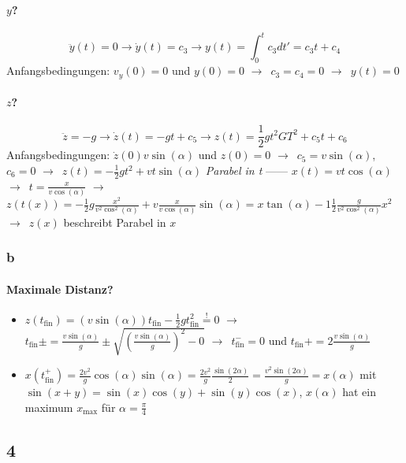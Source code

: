 \documentclass[oneside]{book}
\theoremstyle{definition}
\newcommand{\conseq}{$\rightarrow$~}
\newcommand{\tfin}{t_\text{fin}}
\begin{document}
\paragraph{$y$?}
$$\ddot{y}(t) = 0 \rightarrow \dot{y}(t) = c_3 \rightarrow y(t) = \int_0^t c_3 d t' = c_3 t + c_4$$
Anfangsbedingungen: $v_y(0) = 0$ und $y(0) = 0$ \conseq $c_3 = c_4 = 0$ \conseq $y(t) = 0$

\paragraph{$z$?}
$$\ddot{z} = -g \rightarrow \dot{z}(t) = - gt + c_5 \rightarrow z(t) = \frac{1}{2} g t^2 GT^2 + c_5 t +c_6$$
Anfangsbedingungen: $\dot{z}(0) v \sin(\alpha)$ und $z(0) = 0$ \conseq $c_5 = v \sin(\alpha)$, $c_6 = 0$ \conseq $z(t) = - \frac{1}{2} g t^2 + v t \sin(\alpha)$ \textit{Parabel in t}
------
$x(t) = v t \cos(\alpha)$ \conseq $t = \frac{x}{v \cos(\alpha)}$ \conseq $z(t(x)) = - \frac{1}{2} g \frac{x^2}{v^2 \cos^2(\alpha)} + v \frac{x}{v \cos(\alpha)} \sin(\alpha) = x\tan(\alpha) - 1 \frac{1}{2} \frac{g}{v^2 \cos^2(\alpha)} x^2$ \conseq $z(x)$ beschreibt Parabel in $x$

\subsubsection{b}

\paragraph{Maximale Distanz?}
\begin{itemize}
	\item $z(\tfin) = (v \sin(\alpha)) \tfin - \frac{1}{2} g \tfin^2 \overset{!}{=} 0$ \conseq $\tfin\pm = \frac{v \sin(\alpha)}{g} \pm \sqrt{(\frac{v \sin(\alpha)}{g})^2 - 0}$ \conseq $\tfin^- = 0$ und $\tfin+ = 2 \frac{v \sin(\alpha)}{g}$
	\item $x(\tfin^+) = \frac{2 v^2}{g} \cos(\alpha) \sin(\alpha) = \frac{2v^2}{g} \frac{\sin(2\alpha)}{2} = \frac{v^2 \sin(2 \alpha)}{g} = x(\alpha)$ mit $\sin(x + y) = \sin(x)\cos(y) + \sin(y)\cos(x)$, $x(\alpha)$ hat ein maximum $x_\text{max}$ für $\alpha = \frac{\pi}{4}$
\end{itemize} 


\subsection{4}
\end{document}
